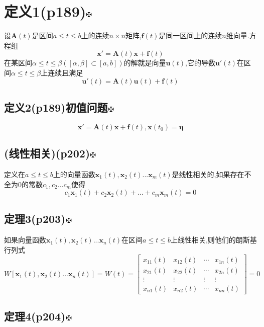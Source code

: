 \documentclass[11pt, a4paper, UTF8]{ctexart}
\begin{document}
\section{定义1(p189)\protect\hyperlink{catalog}{$\fuck$}}
设$\bm{A}(t)$是区间$a\le t\le b$上的连续$n\times n$矩阵,$\bm{f}(t)$是同一区间上的连续$n$维向量.方程组
$$\bm{x}'=\bm{A}(t)\bm{x}+\bm{f}(t)$$
在某区间$\alpha\le t\le\beta([\alpha,\beta]\subset[a,b])$的解就是向量$\bm{u}(t)$,它的导数$\bm{u}'(t)$在区间$\alpha\le t\le\beta$上连续且满足
$$\bm{u}'(t)=\bm{A}(t)\bm{u}(t)+\bm{f}(t)$$
\begin{Large}
\section{定义2(p189)初值问题\protect\hyperlink{catalog}{$\fuck$}}
\end{Large}
$$\bm{x}'=\bm{A}(t)\bm{x}+\bm{f}(t),\bm{x}(t_0)=\bm\eta$$
\begin{Large}
\section{(线性相关)(p202)\protect\hyperlink{catalog}{$\fuck$}}
\end{Large}
定义在$a\le t\le b$上的向量函数$\bm{x}_1(t),\bm{x}_2(t)...\bm{x}_m(t)$是线性相关的,如果存在不全为0的常数$c_1,c_2...c_m$使得$$c_1\bm{x}_1(t)+c_2\bm{x}_2(t)+...+c_m\bm{x}_m(t)=0$$
\begin{Large}
\section{定理3(p203)\protect\hyperlink{catalog}{$\fuck$}}
\end{Large}
如果向量函数$\bm{x}_1(t),\bm{x}_2(t)...\bm{x}_n(t)$在区间$a\le t\le b$上线性相关,则他们的朗斯基行列式
$$
W[\bm{x}_1(t),\bm{x}_2(t)...\bm{x}_n(t)]=W(t)=
\begin{bmatrix}
x_{11}(t)&x_{12}(t)&\cdots&x_{1n}(t)\\
x_{21}(t)&x_{22}(t)&\cdots&x_{2n}(t)\\
\vdots&\vdots&\vdots&\vdots\\
x_{n1}(t)&x_{n2}(t)&\cdots&x_{nn}(t)
\end{bmatrix}
=0
$$
\begin{Large}
\section{定理4(p204)\protect\hyperlink{catalog}{$\fuck$}}
\end{Large}
\end{document}
